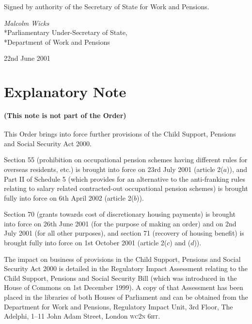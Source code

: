 \documentclass[12pt,a4paper]{article}
\begin{document}

\bigskip

Signed 
by authority of the Secretary of State for Work and Pensions.

{\raggedleft
\emph{Malcolm Wicks}\\*Parliamentary Under-Secretary of State,\\*Department of Work and Pensions

}

22nd June 2001

\small

\part{Explanatory Note}

\renewcommand\parthead{— Explanatory Note}

\subsection*{(This note is not part of the Order)}

This Order brings into force further provisions of the Child Support, Pensions and Social Security Act 2000.

Section 55 (prohibition on occupational pension schemes having different rules for overseas residents, etc.) is brought into force on 23rd July 2001 (article 2($a$)), and Part II of Schedule 5 (which provides for an alternative to the anti-franking rules relating to salary related contracted-out occupational pension schemes) is brought fully into force on 6th April 2002 (article 2($b$)).

Section 70 (grants towards cost of discretionary housing payments) is brought into force on 26th June 2001 (for the purpose of making an order) and on 2nd July 2001 (for all other purposes), and section 71 (recovery of housing benefit) is brought fully into force on 1st October 2001 (article 2($c$)  and ($d$)).

The impact on business of provisions in the Child Support, Pensions and Social Security Act 2000 is detailed in the Regulatory Impact Assessment relating to the Child Support, Pensions and Social Security Bill (which was introduced in the House of Commons on 1st December 1999). A copy of that Assessment has been placed in the libraries of both Houses of Parliament and can be obtained from the Department for Work and Pensions, Regulatory Impact Unit, 3rd Floor, The Adelphi, 1--11 John Adam Street, London \textsc{\lowercase{WC2N 6HT}}. 
\end{document}
